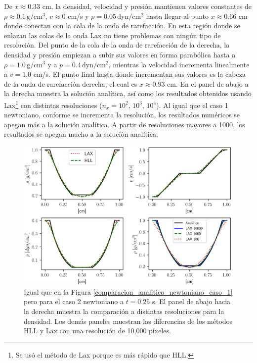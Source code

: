 \documentclass[12pt,a4paper]{book}
\begin{document}
De $x \approx 0.33$ cm, la densidad, velocidad y presión 
mantienen valores constantes de $\rho \approx 0.1 \,  \text{g}/ \text{cm}^3$, $v \approx 0$ cm/s y 
$p = 0.05 \,  \text{dyn}/ \text{cm}^2 $ 
hasta llegar al punto $x \approx 0.66$ cm donde conectan con la cola de la onda de rarefacción. En
esta región donde se enlazan las colas de la onda Lax no tiene problemas con ningún tipo de resolución.
Del punto de la cola de la onda de rarefacción de la derecha, la densidad y presión empiezan a subir 
sus valores en forma parabólica hasta a $\rho  =  1.0 \,  \text{g}/ \text{cm}^3 $ y 
a $p = 0.4 \,  \text{dyn}/ \text{cm}^2 $, 
mientras la velocidad incrementa
linealmente a $v = 1.0$ cm/s. El punto final hasta donde incrementan sus valores es la cabeza de la onda 
de rarefacción derecha, el cual es $ x \approx 0.93 $ cm.
En el panel de abajo a la derecha muestra la solución analítica, así como los resultados obtenidos 
usando Lax\footnote{
  Se usó el método de Lax porque es más rápido que HLL. 
}
con distintas resoluciones ($n_x = 10^2, \, 10^3, \,10^4$). Al igual que el caso 1 newtoniano,
conforme se incrementa la resolución, los resultados numéricos se apegan más a la solución analítica.
A partir de resoluciones mayores a 1000, los resultados se apegan mucho a la solución analítica.




\begin{figure}
  \centering
    \includegraphics[width=1.0\textwidth]{./Figuras/capitulo_3/rarefaction-rarefaction.png}
  \caption{ Igual que en la Figura \ref{comparacion_analitico_newtoniano_caso_1} pero para el 
  caso 2 newtoniano a $t = 0.25$ s.
  El panel de abajo hacia la derecha muestra la comparación a distintas resoluciones para la densidad. 
  Los demás paneles muestran las diferencias de los métodos HLL y Lax con una resolución 
  de 10,000 píxeles.
  \label{comparacion_analitico_newtoniano_caso_2}} 
\end{figure}
\end{document}
